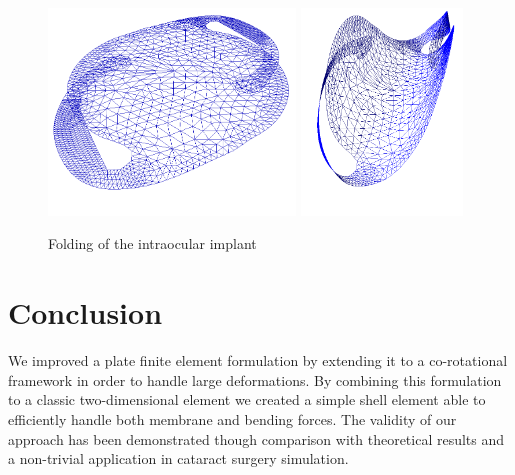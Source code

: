 \documentclass{llncs}
\begin{document}
\begin{figure}[!h]
\begin{center}
\includegraphics[height=5.5cm]{images/implant_haptics_in}
\includegraphics[height=5.5cm]{images/implant_folded}
\caption [Lens imlant] {Folding of the intraocular implant}
\label{fig-implantFolded}
\end{center}
\end{figure}

\section{Conclusion}

We improved a plate finite element formulation by extending it to a co-rotational framework in order to handle large deformations. By combining this formulation to a classic two-dimensional element we created a simple shell element able to efficiently handle both membrane and bending forces. The validity of our approach has been demonstrated though comparison with theoretical results and a non-trivial application in cataract surgery simulation.

 
 
\end{document}
